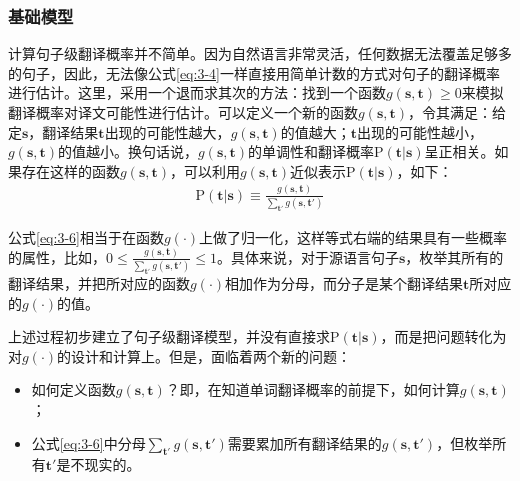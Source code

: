 
\subsubsection{基础模型}

\vspace{0.5em}
\parinterval 计算句子级翻译概率并不简单。因为自然语言非常灵活，任何数据无法覆盖足够多的句子，因此，无法像公式\ref{eq:3-4}一样直接用简单计数的方式对句子的翻译概率进行估计。这里，采用一个退而求其次的方法：找到一个函数$g(\mathbf{s},\mathbf{t})\ge 0$来模拟翻译概率对译文可能性进行估计。可以定义一个新的函数$g(\mathbf{s},\mathbf{t})$，令其满足：给定$\mathbf{s}$，翻译结果$\mathbf{t}$出现的可能性越大，$g(\mathbf{s},\mathbf{t})$的值越大；$\mathbf{t}$出现的可能性越小，$g(\mathbf{s},\mathbf{t})$的值越小。换句话说，$g(\mathbf{s},\mathbf{t})$的单调性和翻译概率$\textrm{P}(\mathbf{t}|\mathbf{s})$呈正相关。如果存在这样的函数$g(\mathbf{s},\mathbf{t}
)$，可以利用$g(\mathbf{s},\mathbf{t})$近似表示$\textrm{P}(\mathbf{t}|\mathbf{s})$，如下：
\begin{eqnarray}
\textrm{P}(\mathbf{t}|\mathbf{s})  \equiv  \frac{g(\mathbf{s},\mathbf{t})}{\sum_{\mathbf{t}'}g(\mathbf{s},\mathbf{t}')}
\label{eq:3-6}
\end{eqnarray}

\parinterval 公式\ref{eq:3-6}相当于在函数$g(\cdot)$上做了归一化，这样等式右端的结果具有一些概率的属性，比如，$0 \le \frac{g(\mathbf{s},\mathbf{t})}{\sum_{\mathbf{t'}}g(\mathbf{s},\mathbf{t'})} \le 1$。具体来说，对于源语言句子$\mathbf{s}$，枚举其所有的翻译结果，并把所对应的函数$g(\cdot)$相加作为分母，而分子是某个翻译结果$\mathbf{t}$所对应的$g(\cdot)$的值。

\parinterval 上述过程初步建立了句子级翻译模型，并没有直接求$\textrm{P}(\mathbf{t}|\mathbf{s})$，而是把问题转化为对$g(\cdot)$的设计和计算上。但是，面临着两个新的问题：

\begin{itemize}
\vspace{0.5em}
\item 如何定义函数$g(\mathbf{s},\mathbf{t})$？即，在知道单词翻译概率的前提下，如何计算$g(\mathbf{s},\mathbf{t})$；
\vspace{0.5em}
\item 公式\ref{eq:3-6}中分母$\sum_{\mathbf{t'}}g(\mathbf{s},{\mathbf{t}'})$需要累加所有翻译结果的$g(\mathbf{s},{\mathbf{t}'})$，但枚举所有${\mathbf{t}'}$是不现实的。
\vspace{0.5em}
\end{itemize}

